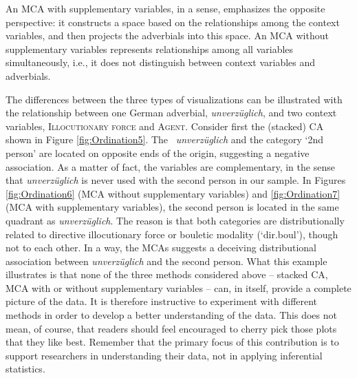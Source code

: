 An MCA with supplementary variables, in a sense, emphasizes the
opposite perspective: it constructs a space based on the relationships
among the context variables, and then projects the adverbials into this
space. An MCA without supplementary variables represents relationships
among all variables simultaneously, i.e., it does not distinguish
between context variables and adverbials.


The differences between the three types of visualizations can be
illustrated with the relationship between one German adverbial,
\textit{unverzüglich}, and two context variables,
\textsc{Illocutionary force} and \textsc{Agent}. Consider first the
(stacked) CA shown in Figure \ref{fig:Ordination5}. The \ipadv\
\textit{unverzüglich} and the category `2nd person' are located on opposite
ends of the origin, suggesting a negative association. As a matter of
fact, the variables are complementary, in the sense that
\textit{unverzüglich} is never used with the second person in our
sample. In Figures \ref{fig:Ordination6} (MCA without supplementary
variables) and \ref{fig:Ordination7} (MCA with supplementary
variables), the second person is located in the same quadrant as
\textit{unverzüglich}. The reason is that both categories are
distributionally related to directive illocutionary force or bouletic
modality (`dir.boul'), though not to each other. In a way, the MCAs
suggests a deceiving distributional association between
\textit{unverzüglich} and the second person.
%
What this example illustrates is that none of the three methods
considered above -- stacked CA, MCA with or without supplementary
variables -- can, in itself, provide a complete picture of the
data. It is therefore instructive to experiment with different methods
in order to develop a better understanding of the data. This does not
mean, of course, that readers should feel encouraged to cherry pick
those plots that they like best. Remember that the primary focus of this
contribution is to support researchers in understanding their data,
not in applying inferential statistics.

